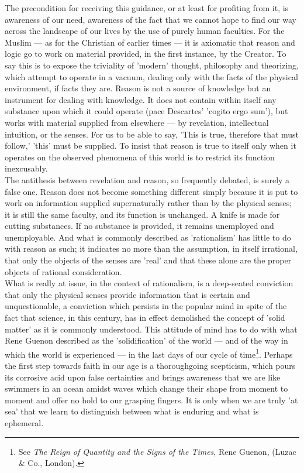 \documentclass[11pt, b5paper, twoside]{book}
\begin{document}
The precondition for receiving this guidance, or at least for profiting from it, is awareness of our 
need, awareness of the fact that we cannot hope to find our way across the landscape of our lives by 
the use of purely human faculties. For the Muslim --- as for the Christian of earlier times --- it is 
axiomatic that reason and logic go to work on material provided, in the first instance, by the 
Creator. To say this is to expose the triviality of 'modern' thought, philosophy and theorizing, 
which attempt to operate in a vacuum, dealing only with the facts of the physical environment, if 
facts they are. Reason is not a source of knowledge but an instrument for dealing with knowledge. It 
does not contain within itself any substance upon which it could operate (pace Descartes' 'cogito 
ergo sum'), but works with material supplied from elsewhere --- by revelation, intellectual intuition, 
or the senses. For us to be able to say, 'This is true, therefore that must follow,' 'this' must be 
supplied. To insist that reason is true to itself only when it operates on the observed phenomena of 
this world is to restrict its function inexcusably. \\

The antithesis between revelation and reason, so frequently debated, is surely a false one. Reason 
does not become something different simply because it is put to work on information supplied 
supernaturally rather than by the physical senses; it is still the same faculty, and its function is 
unchanged. A knife is made for cutting substances. If no substance is provided, it remains unemployed 
and unemployable. And what is commonly described as 'rationalism' has little to do with reason as 
such; it indicates no more than the assumption, in itself irrational, that only the objects of the 
senses are 'real' and that these alone are the proper objects of rational consideration. \\

What is really at issue, in the context of rationalism, is a deep-seated conviction that only the 
physical senses provide information that is certain and unquestionable, a conviction which persists 
in the popular mind in spite of the fact that science, in this century, has in effect demolished the 
concept of 'solid matter' as it is commonly understood. This attitude of mind has to do with what 
Rene Guenon described as the 'solidification' of the world --- and of the way in which the world is 
experienced --- in the last days of our cycle of time\footnote{See \emph{The Reign of Quantity and the Signs of the Times}, Rene Guenon, (Luzac \& Co., London).}. Perhaps the first step towards faith in our 
age is a thoroughgoing scepticism, which pours its corrosive acid upon false certainties and brings 
awareness that we are like swimmers in an ocean amidst waves which change their shape from moment to moment and offer no hold to our grasping fingers. It is only when we are truly 'at sea' that we learn 
to distinguish between what is enduring and what is ephemeral. \\
\end{document}
